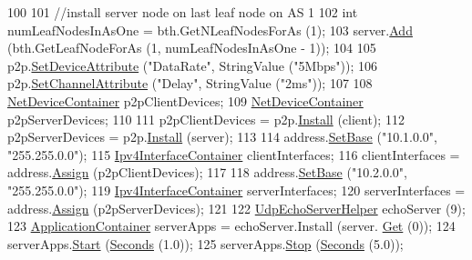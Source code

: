 \begin{DoxyCode}
100 
101   \textcolor{comment}{//install server node on last leaf node on AS 1}
102   \textcolor{keywordtype}{int} numLeafNodesInAsOne = bth.GetNLeafNodesForAs (1);
103   server.\hyperlink{classns3_1_1NodeContainer_aa60b3a0e70f2fb324e16ffcf8bf31fcb}{Add} (bth.GetLeafNodeForAs (1, numLeafNodesInAsOne - 1));
104 
105   p2p.\hyperlink{classns3_1_1PointToPointHelper_a4577f5ab8c387e5528af2e0fbab1152e}{SetDeviceAttribute} (\textcolor{stringliteral}{"DataRate"}, StringValue (\textcolor{stringliteral}{"5Mbps"}));
106   p2p.\hyperlink{classns3_1_1PointToPointHelper_a6b5317fd17fb61e5a53f8d66a90b63b9}{SetChannelAttribute} (\textcolor{stringliteral}{"Delay"}, StringValue (\textcolor{stringliteral}{"2ms"}));
107 
108   \hyperlink{classns3_1_1NetDeviceContainer}{NetDeviceContainer} p2pClientDevices;
109   \hyperlink{classns3_1_1NetDeviceContainer}{NetDeviceContainer} p2pServerDevices;
110 
111   p2pClientDevices = p2p.\hyperlink{classns3_1_1PointToPointHelper_ab9162fea3e88722666fed1106df1f9ec}{Install} (client);
112   p2pServerDevices = p2p.\hyperlink{classns3_1_1PointToPointHelper_ab9162fea3e88722666fed1106df1f9ec}{Install} (server);
113 
114   address.\hyperlink{classns3_1_1Ipv4AddressHelper_acf7b16dd25bac67e00f5e25f90a9a035}{SetBase} (\textcolor{stringliteral}{"10.1.0.0"}, \textcolor{stringliteral}{"255.255.0.0"});
115   \hyperlink{classns3_1_1Ipv4InterfaceContainer}{Ipv4InterfaceContainer} clientInterfaces;
116   clientInterfaces = address.\hyperlink{classns3_1_1Ipv4AddressHelper_af8e7f4a1a7e74c00014a1eac445a27af}{Assign} (p2pClientDevices);
117 
118   address.\hyperlink{classns3_1_1Ipv4AddressHelper_acf7b16dd25bac67e00f5e25f90a9a035}{SetBase} (\textcolor{stringliteral}{"10.2.0.0"}, \textcolor{stringliteral}{"255.255.0.0"});
119   \hyperlink{classns3_1_1Ipv4InterfaceContainer}{Ipv4InterfaceContainer} serverInterfaces;
120   serverInterfaces = address.\hyperlink{classns3_1_1Ipv4AddressHelper_af8e7f4a1a7e74c00014a1eac445a27af}{Assign} (p2pServerDevices);
121 
122   \hyperlink{classns3_1_1UdpEchoServerHelper}{UdpEchoServerHelper} echoServer (9);
123   \hyperlink{classns3_1_1ApplicationContainer}{ApplicationContainer} serverApps = echoServer.Install (server.
      \hyperlink{classns3_1_1NodeContainer_a9ed96e2ecc22e0f5a3d4842eb9bf90bf}{Get} (0));
124   serverApps.\hyperlink{classns3_1_1ApplicationContainer_a8eff87926507020bbe3e1390358a54a7}{Start} (\hyperlink{group__timecivil_ga33c34b816f8ff6628e33d5c8e9713b9e}{Seconds} (1.0));
125   serverApps.\hyperlink{classns3_1_1ApplicationContainer_adfc52f9aa4020c8714679b00bbb9ddb3}{Stop} (\hyperlink{group__timecivil_ga33c34b816f8ff6628e33d5c8e9713b9e}{Seconds} (5.0));

\end{DoxyCode}
